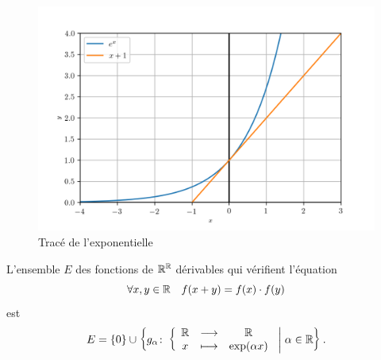 \begin{figure}
  \centering
  \includegraphics[scale=0.6]{exp.png}
  \caption{Tracé de l'exponentielle}
  \label{fig:traceexp}
\end{figure}
%
\begin{theo}
  L'ensemble $E$ des fonctions de $\mathbb{R}^{\mathbb{R}}$ dérivables qui vérifient l'équation
  \begin{equation}
    \label{eq:foncexp}
    \forall x, y \in \mathbb{R} \quad f(x+y)=f(x) \cdot f(y)
  \end{equation}
  est
  \begin{equation}
    E=\left\{0\right\} \cup \left\{g_{\alpha}\colon \left\{\begin{array}{ccc} \mathbb{R} & \longrightarrow &\mathbb{R}\\ x & \longmapsto & \exp(\alpha x) \end{array} \right.\mathrel{}\middle|\mathrel{}\alpha \in \mathbb{R}\right\}.
  \end{equation}
\end{theo}
